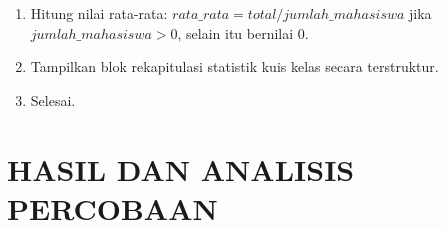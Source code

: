\documentclass[12pt,a4paper]{article}
\begin{document}
\begin{enumerate}
\begin{enumerate}[label=\alph*.]
\begin{enumerate}[label=\roman*.]
            \item Evaluasi percabangan bertingkat:
            \begin{itemize}
                \item Jika $nilai \ge 60$:
                \begin{itemize}
                    \item Jika $nilai \ge 85$: $kategori = \text{"Lulus Sangat Baik"}$.
                    \item Selain itu: $kategori = \text{"Lulus"}$.
                    \item Tambahkan pencacah kelulusan: $lulus = lulus + 1$.
                \end{itemize}
                \item Selain itu (jika $nilai < 60$):
                \begin{itemize}
                    \item Jika $nilai \ge 40$: $kategori = \text{"Remedial"}$, tambahkan $remedial = remedial + 1$.
                    \item Selain itu: $kategori = \text{"Tidak Lulus"}$, tambahkan $tidak\_lulus = tidak\_lulus + 1$.
                \end{itemize}
            \end{itemize}
            \item Tampilkan kategori capaian mahasiswa ke-$i$.
            \item Akumulasikan total nilai: $total = total + nilai$.
            \item Perbarui nilai tertinggi: jika $nilai > tertinggi$, tetapkan $tertinggi = nilai$.
            \item Perbarui nilai terendah: jika $terendah \text{ is None}$ atau $nilai < terendah$, tetapkan $terendah = nilai$.
        \end{enumerate}
        \item Hitung nilai rata-rata: $rata\_rata = total / jumlah\_mahasiswa$ jika $jumlah\_mahasiswa > 0$, selain itu bernilai 0.
        \item Tampilkan blok rekapitulasi statistik kuis kelas secara terstruktur.
        \item Selesai.
    \end{enumerate}
\end{enumerate}

\section{HASIL DAN ANALISIS PERCOBAAN}
\end{document}
